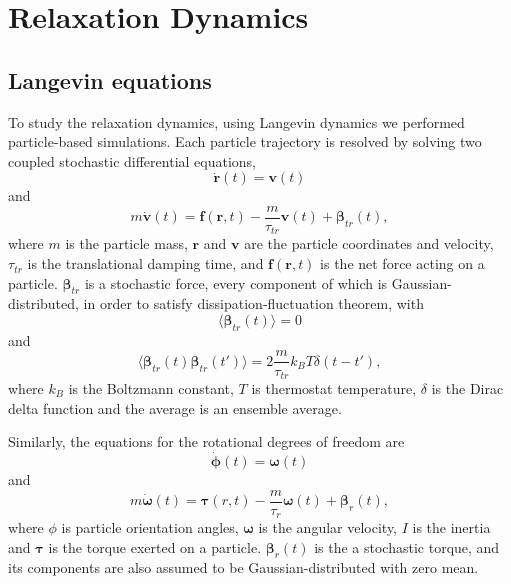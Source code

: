 \section{Relaxation Dynamics}
\label{sec:langevin_dynamics}

\subsection{Langevin equations}
\label{subsec:langevin_equations}
To study the relaxation dynamics, using Langevin dynamics we performed particle-based simulations. Each particle trajectory is resolved by solving two coupled stochastic differential equations,
\begin{equation}
\label{eq:langevin_theory_1}
	\dot{\boldsymbol{r}}(t) = \boldsymbol{v}(t)
\end{equation}
and
\begin{equation}
\label{eq:langevin_theory_2}
	m \dot{\boldsymbol{v}}(t) = \boldsymbol{f}(\boldsymbol{r}, t) - \frac{m}{\tau_{tr}} \boldsymbol{v}(t) + \boldsymbol{\beta}_{tr}(t)
	,
\end{equation}
where $m$ is the particle mass, $\boldsymbol{r}$ and $\boldsymbol{v}$ are the particle coordinates and velocity,  $\tau_{tr}$ is the translational damping time, and $\boldsymbol{f}(\boldsymbol{r}, t)$ is the net force acting on a particle. $\boldsymbol{\beta}_{tr}$ is a stochastic force, every component of which is Gaussian-distributed, in order to satisfy dissipation-fluctuation theorem, with
\begin{equation}
\langle\boldsymbol{\beta}_{tr}(t)\rangle = 0
\end{equation}
and
\begin{equation}
\label{eq:stochastic_term_dispersion}
	\langle\boldsymbol{\beta}_{tr}(t)\boldsymbol{\beta}_{tr}(t')\rangle = 2 \frac{m}{\tau_{tr}} k_B 		T\delta(t - t')
	,
\end{equation}
where $k_B$ is the Boltzmann constant, $T$ is thermostat temperature, $\delta$ is the Dirac delta function and the average is an ensemble average.

Similarly, the equations for the rotational degrees of freedom are
\begin{equation}
\label{eq:langevin_theory_3}
	\dot{\boldsymbol{\phi}}(t) = \boldsymbol{\omega}(t)
\end{equation}
and
\begin{equation}
\label{eq:langevin_theory_4}
	m \dot{\boldsymbol{\omega}}(t) = \boldsymbol{\tau}(r, t) - \frac{m}{\tau_{r}} \boldsymbol{\omega}(t) + \boldsymbol{\beta}_{r}(t)
	,
\end{equation}
where $\phi$ is particle orientation angles, $\boldsymbol{\omega}$ is the angular velocity, $I$ is the inertia and $\boldsymbol{\tau}$ is the torque exerted on a particle. $\boldsymbol{\beta}_{r}(t)$ is the a stochastic torque, and its components are also assumed to be Gaussian-distributed with zero mean.

